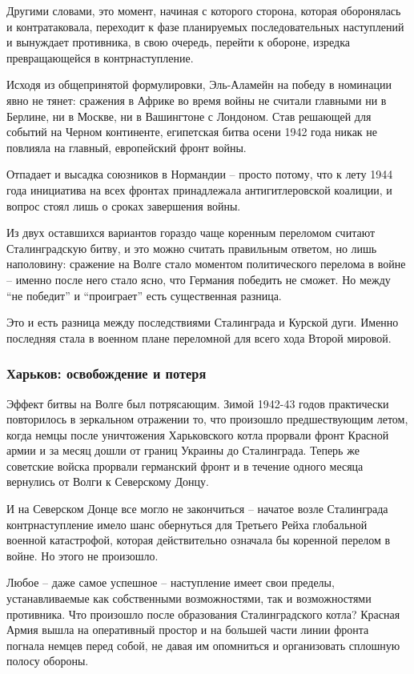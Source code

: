 Другими словами, это момент, начиная с которого сторона, которая оборонялась и
контратаковала, переходит к фазе планируемых последовательных наступлений и
вынуждает противника, в свою очередь, перейти к обороне, изредка превращающейся
в контрнаступление.

Исходя из общепринятой формулировки, Эль-Аламейн на победу в номинации явно не
тянет: сражения в Африке во время войны не считали главными ни в Берлине, ни в
Москве, ни в Вашингтоне с Лондоном. Став решающей для событий на Черном
континенте, египетская битва осени 1942 года никак не повлияла на главный,
европейский фронт войны.

Отпадает и высадка союзников в Нормандии – просто потому, что к лету 1944 года
инициатива на всех фронтах принадлежала антигитлеровской коалиции, и вопрос
стоял лишь о сроках завершения войны.

Из двух оставшихся вариантов гораздо чаще коренным переломом считают
Сталинградскую битву, и это можно считать правильным ответом, но лишь
наполовину: сражение на Волге стало моментом политического перелома в войне –
именно после него стало ясно, что Германия победить не сможет. Но между \enquote{не
победит} и \enquote{проиграет} есть существенная разница.

Это и есть разница между последствиями Сталинграда и Курской дуги. Именно
последняя стала в военном плане переломной для всего хода Второй мировой.

\subsubsection{Харьков: освобождение и потеря}

Эффект битвы на Волге был потрясающим. Зимой 1942-43 годов практически
повторилось в зеркальном отражении то, что произошло предшествующим летом,
когда немцы после уничтожения Харьковского котла прорвали фронт Красной армии и
за месяц дошли от границ Украины до Сталинграда. Теперь же советские войска
прорвали германский фронт и в течение одного месяца вернулись от Волги к
Северскому Донцу.

И на Северском Донце все могло не закончиться – начатое возле Сталинграда
контрнаступление имело шанс обернуться для Третьего Рейха глобальной военной
катастрофой, которая действительно означала бы коренной перелом в войне. Но
этого не произошло.

Любое – даже самое успешное – наступление имеет свои пределы, устанавливаемые
как собственными возможностями, так и возможностями противника. Что произошло
после образования Сталинградского котла? Красная Армия вышла на оперативный
простор и на большей части линии фронта погнала немцев перед собой, не давая им
опомниться и организовать сплошную полосу обороны.


